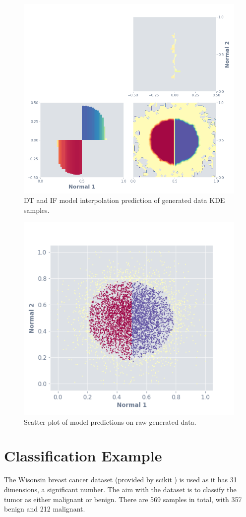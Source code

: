 \documentclass[a4paper, twocolumn]{article}
\begin{document}
\begin{figure}
\centering
\includegraphics[width=0.8\columnwidth]{img/gen_dt_if.png}
\caption{DT and IF model interpolation prediction of generated data KDE samples.}
\label{fig:gen-dt-if}
\end{figure}

\begin{figure}
\centering
\includegraphics[width=0.6\columnwidth]{img/gen_scat.png}
\caption{Scatter plot of model predictions on raw generated data.}
\label{fig:gen-scat}
\end{figure}

\section{Classification Example}

The Wisonsin breast cancer dataset \cite{breastcancer} (provided by scikit \cite{pedregosa2011scikit}) is used as it has 31 dimensions, a significant number. The aim with the dataset is to classify the tumor as either malignant or benign. There are 569 samples in total, with 357 benign and 212 malignant.
\end{document}
